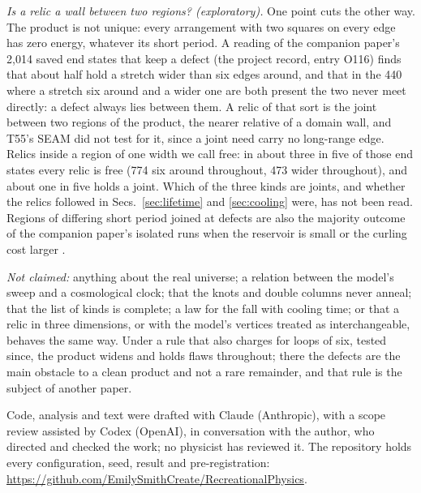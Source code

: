 \documentclass[aps,pre,10pt,twocolumn,superscriptaddress,nofootinbib]{revtex4-2}
\begin{document}
\emph{Is a relic a wall between two regions? (exploratory).} One point cuts the other way. The product is not
unique: every arrangement with two squares on every edge has zero energy, whatever its short period. A reading
of the companion paper's 2,014 saved end states that keep a defect (the project record, entry O116) finds that
about half hold a stretch wider than six edges around, and that in the 440 where a stretch six around and a
wider one are both present the two never meet directly: a defect always lies between them. A relic of that
sort is the joint between two regions of the product, the nearer relative of a domain wall, and T55's SEAM did
not test for it, since a joint need carry no long-range edge. Relics inside a region of one width we call free:
in about three in five of those end states every relic is free (774 six around throughout, 473 wider
throughout), and about one in five holds a joint. Which of the three kinds are joints, and whether
the relics followed in Secs.~\ref{sec:lifetime} and \ref{sec:cooling} were, has not been read. Regions of
differing short period joined at defects are also the majority outcome of the companion paper's isolated runs
when the reservoir is small or the curling cost larger \cite{paper1}.

\emph{Not claimed:} anything about the real universe; a relation between the model's sweep and a cosmological
clock; that the knots and double columns never anneal; that the list of kinds is complete; a law for the fall
with cooling time; or that a relic in three dimensions, or with the model's vertices treated as
interchangeable, behaves the same way. Under a rule that also charges for loops of six, tested since, the
product widens and holds flaws throughout; there the defects are the main obstacle to a clean product and not
a rare remainder, and that rule is the subject of another paper.

\begin{acknowledgments}
Code, analysis and text were drafted with Claude (Anthropic), with a scope review assisted by Codex (OpenAI),
in conversation with the author, who directed and checked the work; no physicist has reviewed it. The
repository holds every configuration, seed, result and pre-registration:
\url{https://github.com/EmilySmithCreate/RecreationalPhysics}.
\end{acknowledgments}
\end{document}
